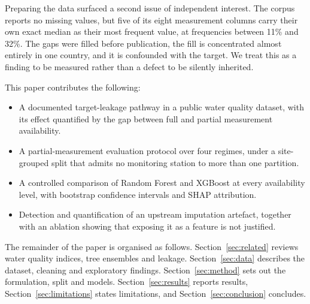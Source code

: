 Preparing the data surfaced a second issue of independent interest. The corpus reports no
missing values, but five of its eight measurement columns carry their own exact median as
their most frequent value, at frequencies between 11\% and 32\%. The gaps were filled
before publication, the fill is concentrated almost entirely in one country, and it is
confounded with the target. We treat this as a finding to be measured rather than a
defect to be silently inherited.

This paper contributes the following:
\begin{itemize}
    \item A documented target-leakage pathway in a public water quality dataset, with its
          effect quantified by the gap between full and partial measurement availability.
    \item A partial-measurement evaluation protocol over four regimes, under a
          site-grouped split that admits no monitoring station to more than one partition.
    \item A controlled comparison of Random Forest and XGBoost at every availability
          level, with bootstrap confidence intervals and SHAP attribution.
    \item Detection and quantification of an upstream imputation artefact, together with
          an ablation showing that exposing it as a feature is not justified.
\end{itemize}

The remainder of the paper is organised as follows. Section~\ref{sec:related} reviews
water quality indices, tree ensembles and leakage. Section~\ref{sec:data} describes the
dataset, cleaning and exploratory findings. Section~\ref{sec:method} sets out the
formulation, split and models. Section~\ref{sec:results} reports results,
Section~\ref{sec:limitations} states limitations, and Section~\ref{sec:conclusion}
concludes.
